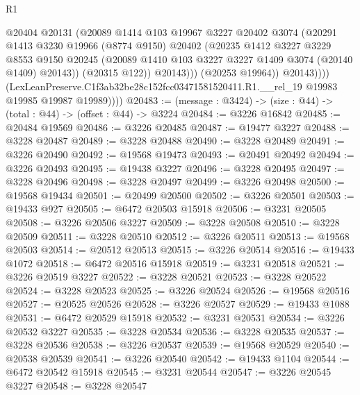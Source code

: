 \begin{lexlean}{R1}
\begin{coremodule}
                        @20404
                        @20131
                        (@20089
                          @1414
                          @103
                          @19967
                          @3227
                          @20402
                          @3074
                          (@20291
                            @1413
                            @3230
                            @19966
                            (@8774 @9150)
                            @20402
                            (@20235
                              @1412
                              @3227
                              @3229
                              @8553
                              @9150
                              @20245
                              (@20089 @1410 @103 @3227 @3227 @1409 @3074 (@20140 @1409) @20143))
                            (@20315 @122))
                          @20143)))
                    (@20253 @19964))
                  @20143))))
          (LexLeanPreserve.C1f3ab32be28c152fcc03471581520411.R1.__rel_19
            @19983
            @19985
            @19987
            @19989))))
@20483 := (message : @3424) -> (size : @44) -> (total : @44) -> (offset : @44) -> @3224
@20484 := @3226 @16842
@20485 := @20484 @19569
@20486 := @3226 @20485
@20487 := @19477 @3227
@20488 := @3228 @20487
@20489 := @3228 @20488
@20490 := @3228 @20489
@20491 := @3226 @20490
@20492 := @19568 @19473
@20493 := @20491 @20492
@20494 := @3226 @20493
@20495 := @19438 @3227
@20496 := @3228 @20495
@20497 := @3228 @20496
@20498 := @3228 @20497
@20499 := @3226 @20498
@20500 := @19568 @19434
@20501 := @20499 @20500
@20502 := @3226 @20501
@20503 := @19433 @927
@20505 := @6472 @20503 @15918
@20506 := @3231 @20505
@20508 := @3226 @20506 @3227
@20509 := @3228 @20508
@20510 := @3228 @20509
@20511 := @3228 @20510
@20512 := @3226 @20511
@20513 := @19568 @20503
@20514 := @20512 @20513
@20515 := @3226 @20514
@20516 := @19433 @1072
@20518 := @6472 @20516 @15918
@20519 := @3231 @20518
@20521 := @3226 @20519 @3227
@20522 := @3228 @20521
@20523 := @3228 @20522
@20524 := @3228 @20523
@20525 := @3226 @20524
@20526 := @19568 @20516
@20527 := @20525 @20526
@20528 := @3226 @20527
@20529 := @19433 @1088
@20531 := @6472 @20529 @15918
@20532 := @3231 @20531
@20534 := @3226 @20532 @3227
@20535 := @3228 @20534
@20536 := @3228 @20535
@20537 := @3228 @20536
@20538 := @3226 @20537
@20539 := @19568 @20529
@20540 := @20538 @20539
@20541 := @3226 @20540
@20542 := @19433 @1104
@20544 := @6472 @20542 @15918
@20545 := @3231 @20544
@20547 := @3226 @20545 @3227
@20548 := @3228 @20547

\end{coremodule}
\end{lexlean}

